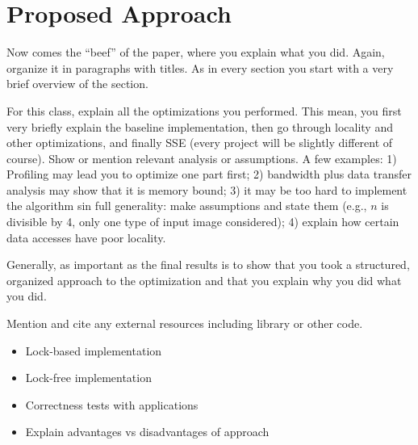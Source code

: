 \section{Proposed Approach}\label{sec:approach}

Now comes the ``beef'' of the paper, where you explain what you
did. Again, organize it in paragraphs with titles. As in every section
you start with a very brief overview of the section.

For this class, explain all the optimizations you performed. This mean, you first very briefly
explain the baseline implementation, then go through locality and other optimizations, and finally SSE (every project will be slightly different of course). Show or mention relevant analysis or assumptions. A few examples: 1) Profiling may lead you to optimize one part first; 2) bandwidth plus data transfer analysis may show that it is memory bound; 3) it may be too hard to implement the algorithm sin full generality: make assumptions and state them (e.g., $n$ is divisible by 4, only one type of input image considered); 4) explain how certain data accesses have poor locality.

Generally, as important as the final results is to show that you took a structured, organized approach to the optimization and that you explain why you did what you did.

Mention and cite any external resources including library or other code.

\begin{itemize}
	\item Lock-based implementation
	\item Lock-free implementation
	\item Correctness tests with applications
	\item Explain advantages vs disadvantages of approach
\end{itemize}